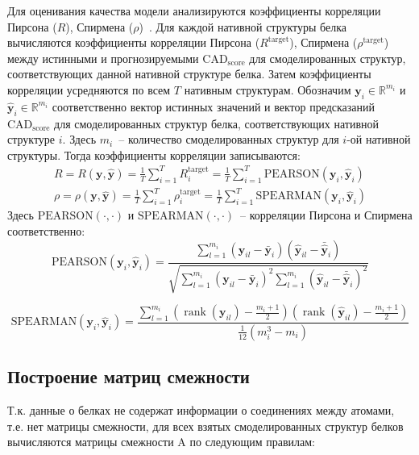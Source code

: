 \documentclass[14pt]{extarticle}
\begin{document}
Для оценивания качества модели анализируются коэффициенты корреляции Пирсона ($R$), Спирмена ($\rho$)~\cite{3DCNN, Baldassarre2019GraphQAPM, 10.1093/bioinformatics/btz122}. Для каждой нативной структуры белка вычисляются коэффициенты корреляции Пирсона ($R^\text{target}$), Спирмена ($\rho^\text{target}$) между истинными и прогнозируемыми $\text{CAD}_\text{score}$ для смоделированных структур, соответствующих данной нативной структуре белка. Затем коэффициенты корреляции усредняются по всем $T$ нативным структурам. Обозначим $\mathbf{y}_i \in \mathbb{R}^{m_i}$ и $\mathbf{\hat{y}}_i \in \mathbb{R}^{m_i}$ соответственно вектор истинных значений и вектор предсказаний $\text{CAD}_\text{score}$ для смоделированных структур белка, соответствующих нативной структуре $i$. Здесь $m_i$~-- количество смоделированных структур для $i$-ой нативной структуры. Тогда коэффициенты корреляции записываются:
$$\begin{aligned}
R = R\left(\mathbf{y}, \hat{\mathbf{y}}\right) = \frac{1}{T} \sum_{i=1}^{T} R^\text{target}_i=\frac{1}{T} \sum_{i=1}^{T} \text{PEARSON} \left(\mathbf{y}_i,\hat{\mathbf{y}}_i\right) \\ 
\rho= \rho\left(\mathbf{y}, \hat{\mathbf{y}}\right) = \frac{1}{T} \sum_{i=1}^{T} \rho^\text{target}_i = \frac{1}{T} \sum_{i=1}^{T} \text{SPEARMAN} \left(\mathbf{y}_i,\hat{\mathbf{y}}_i\right)
\end{aligned}$$
Здесь $\text{PEARSON} (\cdot, \cdot)$ и $\text{SPEARMAN} (\cdot, \cdot)$~-- корреляции Пирсона и Спирмена соответственно:
\[\text{PEARSON}\left(\mathbf{y}_i,\hat{\mathbf{y}}_i\right) = \frac{\sum_{l=1}^{m_i}\left(\mathbf{y}_{i l}-\bar{\mathbf{y}}_{i}\right)\left( \hat{\mathbf{y}}_{i l}-\bar{ \hat{\mathbf{y}}}_{i}\right)}{\sqrt{\sum_{l=1}^{m_i}\left( \mathbf{y}_{i l}-\bar{ \mathbf{y}}_{i}\right)^{2} \sum_{l=1}^{m_i}\left( \hat{\mathbf{y}}_{i l}-\bar{ \hat{\mathbf{y}}}_{i}\right)^{2}}}\]

\[ \text{SPEARMAN} \left(\mathbf{y}_i,\hat{\mathbf{y}}_i\right)=\frac{\sum_{l=1}^{m_i}\left(\operatorname{rank}\left(
	\mathbf{y}_{i l}\right)-\frac{m_i+1}{2}\right)\left(\operatorname{rank}\left( \hat{\mathbf{y}}_{i l}\right)-\frac{m_i+1}{2}\right)}{\frac{1}{12}\left(m_i^{3}-m_i\right)}\]

\subsection{Построение матриц смежности}
Т.к. данные о белках не содержат информации о соединениях между атомами, т.е. нет матрицы смежности, для всех взятых смоделированных структур белков вычисляются матрицы смежности A по следующим правилам:
\end{document}
